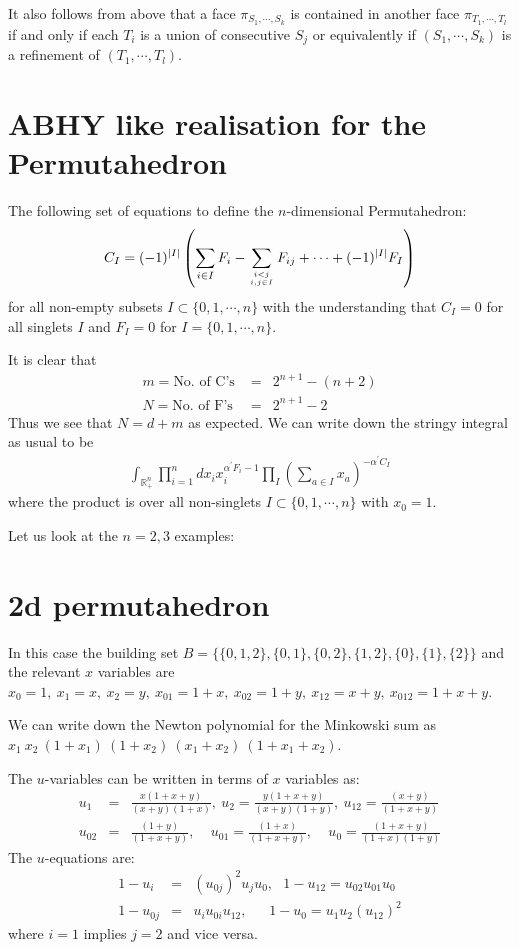 \documentclass[hidelinks,12pt]{article}
\newcommand{\bea}[1]{\begin{eqnarray}\label{#1} }
\newcommand{\eea}{\end{eqnarray}}
\def\bea{\begin{eqnarray}}
\def\eea{\end{eqnarray}}
\begin{document}
It also follows from above that a face $\pi_{S_1,\cdots,S_k}$ is contained in another face $\pi_{T_1,\cdots,T_l}$ if and only if each $T_i$ is a union of consecutive $S_j$ or equivalently if $(S_1,\cdots,S_k)$ is a refinement of $(T_1,\cdots,T_l)$.

\section*{ABHY like realisation for the Permutahedron}
The following set of equations to define the $n$-dimensional Permutahedron: 
\bea
C_I = (-1)^{|I|} \left( \sum_{i \in I} F_i - \sum _{{i<j}\atop{i,j \in I}} F_{ij} +\cdots + (-1)^{|I|}  F_I \right) \nonumber
\eea
for all non-empty subsets $I \subset \{0,1,\cdots,n\}$ with the understanding that $C_{I} =0$ for all singlets $I$ and $F_{I} =0$ for $I=\{ 0,1,\cdots,n \}$. 

It is clear that
\bea
m= \text{No. of  C's }&=& 2^{n+1}-(n+2) \nonumber \\
N= \text{No. of F's} &=& 2^{n+1}- 2 \nonumber 
\eea
Thus we see that $N= d+m$ as expected. We can write down the stringy integral as usual to be 
\bea
\int_{\mathbb{R}^{n}_{+}} \prod_{i =1}^{n} d x_i x_i^{\alpha^{'} F_i -1} \prod_{I} \left (\sum_{a\in I} x_a \right) ^{-\alpha^{'} C_I} \nonumber
\eea 
where the product is over all non-singlets $ I \subset \{0,1,\cdots,n\}$ with $x_{0} =1$.

Let us look at the $n=2,3$ examples:

\section*{2d permutahedron}
In this case the building set $B=\{ \{ 0,1,2\},\{ 0,1\},\{0,2\},\{1,2\},\{0\},\{1\},\{2\}\}$ and the relevant $x$ variables are $x_0=1, ~x_1=x, ~x_2=y, ~x_{01}=1+x, ~x_{02}=1+y,~ x_{12}=x+y,~ x_{012}=1+x+y$. 

We can write down the Newton polynomial for the Minkowski sum as $ x_1~ x_2~(1+x_1)~(1+x_2)~(x_1+x_2)~(1+x_1+x_2)$.

The $u$-variables can be written in terms of $x$ variables as:
\bea
u_1&=&\frac{x(1+x+y)}{(x+y)(1+x)}, ~ u_2 =\frac{y(1+x+y)}{(x+y)(1+y)},~ u_{12}=\frac{(x+y)}{(1+x+y)}\nonumber \\
u_{02}&=&\frac{(1+y)}{(1+x+y)}, ~~~~~ u_{01}=\frac{(1+x)}{(1+x+y)},~~~~~ u_{0}= \frac{(1+x+y)}{(1+x)(1+y)} \nonumber
\eea
The $u$-equations are:
\bea
1-u_i &=& (u_{0j})^2 u_j u_{0}, ~~~ 1-u_{12} = u_{02} u_{01} u_{0} \nonumber \\
1-u_{0 j} &=& u_i u_{0 i} u_{12}, ~~~~~~~ 1-u_{0} = u_{1} u_{2} (u_{12})^2 \nonumber
\eea
where $i=1$ implies $j=2$ and vice versa.
\end{document}
